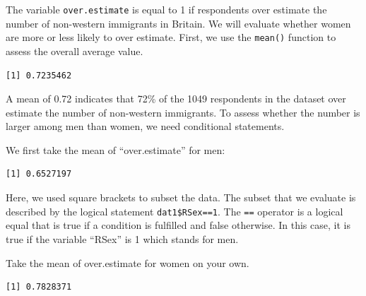 \documentclass[]{article}
\newenvironment{Shaded}{\begin{snugshade}}{\end{snugshade}}
\newcommand{\DecValTok}[1]{\textcolor[rgb]{0.00,0.00,0.81}{#1}}
\newcommand{\KeywordTok}[1]{\textcolor[rgb]{0.13,0.29,0.53}{\textbf{#1}}}
\newcommand{\NormalTok}[1]{#1}
\newcommand{\OperatorTok}[1]{\textcolor[rgb]{0.81,0.36,0.00}{\textbf{#1}}}
\newcommand{\StringTok}[1]{\textcolor[rgb]{0.31,0.60,0.02}{#1}}
\begin{document}
The variable \texttt{over.estimate} is equal to 1 if respondents over estimate the number of non-western immigrants in Britain. We will evaluate whether women are more or less likely to over estimate. First, we use the \texttt{mean()} function to assess the overall average value.

\begin{Shaded}
\end{Shaded}

\begin{verbatim}
[1] 0.7235462
\end{verbatim}

A mean of 0.72 indicates that 72\% of the 1049 respondents in the dataset over estimate the number of non-western immigrants. To assess whether the number is larger among men than women, we need conditional statements.

We first take the mean of ``over.estimate'' for men:

\begin{Shaded}
\end{Shaded}

\begin{verbatim}
[1] 0.6527197
\end{verbatim}

Here, we used square brackets to subset the data. The subset that we evaluate is described by the logical statement \texttt{dat1\$RSex==1}. The \texttt{==} operator is a logical equal that is true if a condition is fulfilled and false otherwise. In this case, it is true if the variable ``RSex'' is 1 which stands for men.

Take the mean of over.estimate for women on your own.

\begin{Shaded}
\end{Shaded}

\begin{verbatim}
[1] 0.7828371
\end{verbatim}
\end{document}
